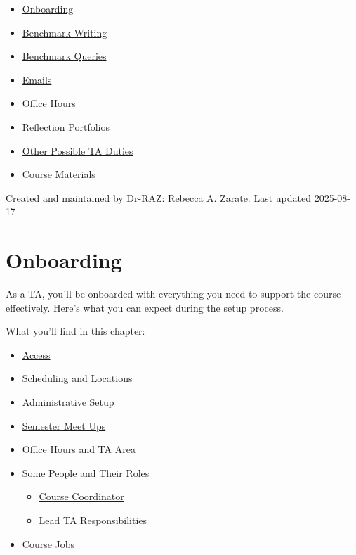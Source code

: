 \documentclass[
]{article}
\providecommand{\tightlist}{%
  \setlength{\itemsep}{0pt}\setlength{\parskip}{0pt}}
\begin{document}
\begin{itemize}
\tightlist
\item
  \protect\hyperlink{onboarding}{Onboarding}
\item
  \protect\hyperlink{benchmark-writing}{Benchmark Writing}
\item
  \protect\hyperlink{benchmark-queries}{Benchmark Queries}
\item
  \protect\hyperlink{emails}{Emails}
\item
  \protect\hyperlink{office-hours}{Office Hours}
\item
  \protect\hyperlink{reflection-portfolios}{Reflection Portfolios}
\item
  \protect\hyperlink{other-possible-ta-duties}{Other Possible TA Duties}
\item
  \protect\hyperlink{course-materials}{Course Materials}
\end{itemize}

Created and maintained by Dr-RAZ: Rebecca A. Zarate. Last updated 2025-08-17

\hypertarget{onboarding}{%
\section{Onboarding}\label{onboarding}}

As a TA, you'll be onboarded with everything you need to support the course effectively. Here's what you can expect during the setup process.

What you'll find in this chapter:

\begin{itemize}
\tightlist
\item
  \protect\hyperlink{access}{Access}
\item
  \protect\hyperlink{scheduling-and-locations}{Scheduling and Locations}
\item
  \protect\hyperlink{administrative-setup}{Administrative Setup}
\item
  \protect\hyperlink{semester-meet-ups}{Semester Meet Ups}
\item
  \protect\hyperlink{office-hours-and-ta-area}{Office Hours and TA Area}
\item
  \protect\hyperlink{some-people-and-their-roles}{Some People and Their Roles}

  \begin{itemize}
  \tightlist
  \item
    \protect\hyperlink{course-coordinator}{Course Coordinator}
  \item
    \protect\hyperlink{lead-ta-responsibilities}{Lead TA Responsibilities}
  \end{itemize}
\item
  \protect\hyperlink{course-jobs}{Course Jobs}
\end{itemize}
\end{document}
